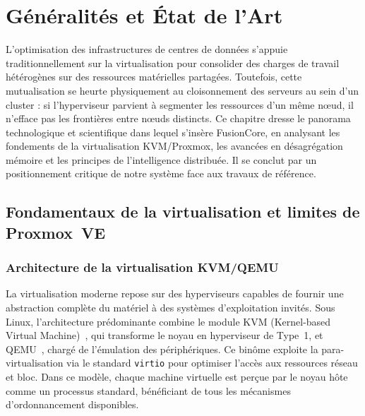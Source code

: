 \chapter{Généralités et État de l'Art}
\label{ch:etat-art}

L'optimisation des infrastructures de centres de données s'appuie traditionnellement sur la virtualisation pour consolider des charges de travail hétérogènes sur des ressources matérielles partagées. Toutefois, cette mutualisation se heurte physiquement au cloisonnement des serveurs au sein d'un cluster : si l'hyperviseur parvient à segmenter les ressources d'un même nœud, il n'efface pas les frontières entre nœuds distincts. Ce chapitre dresse le panorama technologique et scientifique dans lequel s'insère FusionCore, en analysant les fondements de la virtualisation KVM/Proxmox, les avancées en désagrégation mémoire et les principes de l'intelligence distribuée. Il se conclut par un positionnement critique de notre système face aux travaux de référence.

\section{Fondamentaux de la virtualisation et limites de Proxmox~VE}
\label{sec:fondamentaux-virtualisation}

\subsection{Architecture de la virtualisation KVM/QEMU}

La virtualisation moderne repose sur des hyperviseurs capables de fournir une abstraction complète du matériel à des systèmes d'exploitation invités. Sous Linux, l'architecture prédominante combine le module KVM (Kernel-based Virtual Machine)~\cite{kvm_doc}, qui transforme le noyau en hyperviseur de Type~1, et QEMU~\cite{qemu_doc}, chargé de l'émulation des périphériques. Ce binôme exploite la para-virtualisation via le standard \texttt{virtio} pour optimiser l'accès aux ressources réseau et bloc. Dans ce modèle, chaque machine virtuelle est perçue par le noyau hôte comme un processus standard, bénéficiant de tous les mécanismes d'ordonnancement disponibles.

